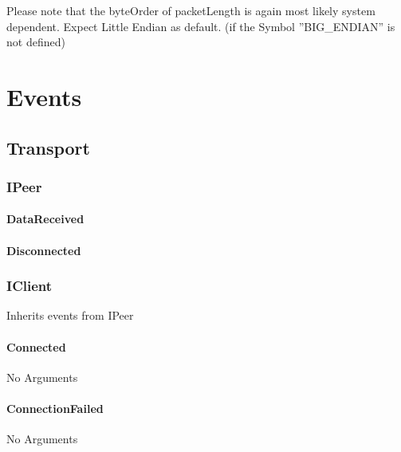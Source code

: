 Please note that the byteOrder of packetLength is again most likely system dependent. Expect Little Endian as default. (if the Symbol ''BIG\_ENDIAN'' is not defined)

\chapter{Events}

\section{Transport}

\subsection{IPeer}
\subsubsection{DataReceived}
\begin{messagedef}
\end{messagedef}

\subsubsection{Disconnected}
\begin{messagedef}
\end{messagedef}

\subsection{IClient}
Inherits events from IPeer

\subsubsection{Connected}
No Arguments


\subsubsection{ConnectionFailed}
No Arguments

